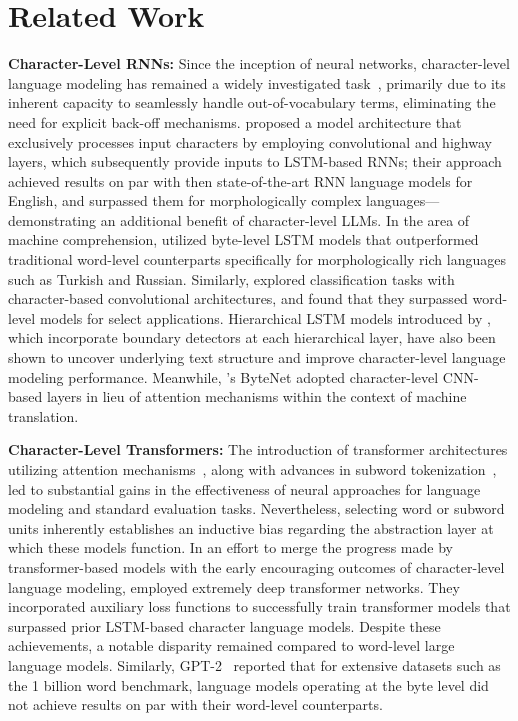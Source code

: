 \section{Related Work}
\label{section:related_work}

\textbf{Character-Level RNNs:} Since the inception of neural networks, character-level language modeling has remained a widely investigated task~\citep{sutskever2011generating,mikolov2012subword,graves2013generating}, primarily due to its inherent capacity to seamlessly handle out-of-vocabulary terms, eliminating the need for explicit back-off mechanisms. \cite{kim2016character} proposed a model architecture that exclusively processes input characters by employing convolutional and highway layers, which subsequently provide inputs to LSTM-based RNNs; their approach achieved results on par with then state-of-the-art RNN language models for English, and surpassed them for morphologically complex languages—demonstrating an additional benefit of character-level LLMs. In the area of machine comprehension, \cite{kenter2018byte} utilized byte-level LSTM models that outperformed traditional word-level counterparts specifically for morphologically rich languages such as Turkish and Russian. Similarly, \cite{zhang2015character} explored classification tasks with character-based convolutional architectures, and found that they surpassed word-level models for select applications. Hierarchical LSTM models introduced by \citet{chung2019hierarchical}, which incorporate boundary detectors at each hierarchical layer, have also been shown to uncover underlying text structure and improve character-level language modeling performance. Meanwhile, \cite{kalchbrenner2016neural}'s ByteNet adopted character-level CNN-based layers in lieu of attention mechanisms within the context of machine translation.

\textbf{Character-Level Transformers:} The introduction of transformer architectures utilizing attention mechanisms~\citep{vaswani2017attention}, along with advances in subword tokenization~\citep{sennrich-etal-2016-neural}, led to substantial gains in the effectiveness of neural approaches for language modeling and standard evaluation tasks. Nevertheless, selecting word or subword units inherently establishes an inductive bias regarding the abstraction layer at which these models function. In an effort to merge the progress made by transformer-based models with the early encouraging outcomes of character-level language modeling, \citet{al2019character} employed extremely deep transformer networks. They incorporated auxiliary loss functions to successfully train transformer models that surpassed prior LSTM-based character language models. Despite these achievements, a notable disparity remained compared to word-level large language models. Similarly, GPT-2~\citep{radfordgpt2} reported that for extensive datasets such as the 1 billion word benchmark, language models operating at the byte level did not achieve results on par with their word-level counterparts.

